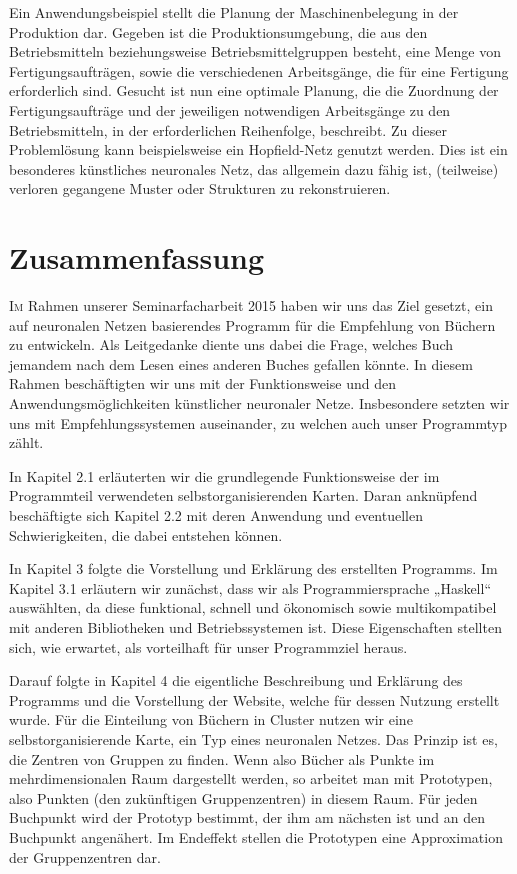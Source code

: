 \documentclass[twoside,a4paper]{article}
\newcommand{\commonlettrine}[1]{\lettrine[nindent=0em,lines=2]{#1}}
\begin{document}
Ein Anwendungsbeispiel stellt die Planung der Maschinenbelegung in der Produktion dar. Gegeben ist die Produktionsumgebung, die aus den Betriebsmitteln beziehungsweise Betriebsmittelgruppen besteht, eine Menge von Fertigungsaufträgen, sowie die verschiedenen Arbeitsgänge, die für eine Fertigung erforderlich sind. Gesucht ist nun eine optimale Planung, die die Zuordnung der Fertigungsaufträge und der jeweiligen notwendigen Arbeitsgänge zu den Betriebsmitteln, in der erforderlichen Reihenfolge, beschreibt. Zu dieser Problemlösung kann beispielsweise ein Hopfield-Netz genutzt werden. Dies ist ein besonderes künstliches neuronales Netz, das allgemein dazu fähig ist, (teilweise) verloren gegangene Muster oder Strukturen zu rekonstruieren.

\section{Zusammenfassung}

\commonlettrine{I}m Rahmen unserer Seminarfacharbeit 2015 haben wir uns das Ziel gesetzt, ein auf neuronalen Netzen basierendes Programm für die Empfehlung von Büchern zu entwickeln. Als Leitgedanke diente uns dabei die Frage, welches Buch jemandem nach dem Lesen eines anderen Buches gefallen könnte. In diesem Rahmen beschäftigten wir uns mit der Funktionsweise und den Anwendungsmöglichkeiten  künstlicher neuronaler Netze. Insbesondere setzten wir uns mit Empfehlungssystemen auseinander, zu welchen auch unser Programmtyp zählt.

In Kapitel 2.1 erläuterten wir die grundlegende Funktionsweise der im Programmteil verwendeten selbstorganisierenden Karten. Daran anknüpfend beschäftigte sich Kapitel 2.2 mit deren Anwendung und eventuellen Schwierigkeiten, die dabei entstehen können.

In Kapitel 3 folgte die Vorstellung und Erklärung des erstellten Programms. Im Kapitel 3.1 erläutern wir zunächst, dass wir als Programmiersprache „Haskell“ auswählten, da diese funktional, schnell und ökonomisch sowie multikompatibel mit anderen Bibliotheken und Betriebssystemen ist. Diese Eigenschaften stellten sich, wie erwartet, als vorteilhaft für unser Programmziel heraus.

Darauf folgte in Kapitel 4 die eigentliche Beschreibung und Erklärung des Programms und die Vorstellung der Website, welche für dessen Nutzung erstellt wurde. Für die Einteilung von Büchern in Cluster nutzen wir eine selbstorganisierende Karte, ein Typ eines neuronalen Netzes. Das Prinzip ist es, die Zentren von Gruppen zu finden. Wenn also Bücher als Punkte im mehrdimensionalen Raum dargestellt werden, so arbeitet man mit Prototypen, also Punkten (den zukünftigen Gruppenzentren) in diesem Raum. Für jeden Buchpunkt wird der Prototyp bestimmt, der ihm am nächsten ist und an den Buchpunkt angenähert. Im Endeffekt stellen die Prototypen eine Approximation der Gruppenzentren dar.
\end{document}

